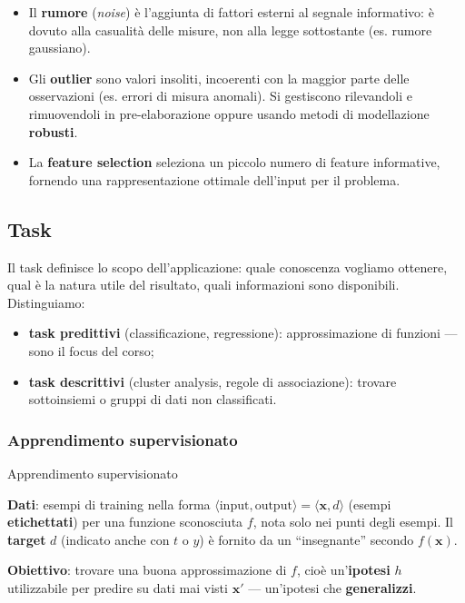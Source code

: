 \begin{itemize}
\tightlist
\item
  Il \textbf{rumore} (\emph{noise}) è l'aggiunta di fattori esterni al
  segnale informativo: è dovuto alla casualità delle misure, non alla
  legge sottostante (es. rumore gaussiano).
\item
  Gli \textbf{outlier} sono valori insoliti, incoerenti con la maggior
  parte delle osservazioni (es. errori di misura anomali). Si gestiscono
  rilevandoli e rimuovendoli in pre-elaborazione oppure usando metodi di
  modellazione \textbf{robusti}.
\item
  La \textbf{feature selection} seleziona un piccolo numero di feature
  informative, fornendo una rappresentazione ottimale dell'input per il
  problema.
\end{itemize}

\subsection{Task}\label{task}

Il task definisce lo scopo dell'applicazione: quale conoscenza vogliamo
ottenere, qual è la natura utile del risultato, quali informazioni sono
disponibili. Distinguiamo:

\begin{itemize}
\tightlist
\item
  \textbf{task predittivi} (classificazione, regressione):
  approssimazione di funzioni --- sono il focus del corso;
\item
  \textbf{task descrittivi} (cluster analysis, regole di associazione):
  trovare sottoinsiemi o gruppi di dati non classificati.
\end{itemize}

\subsubsection{Apprendimento
supervisionato}\label{apprendimento-supervisionato}

\begin{boxdefinition}{Apprendimento supervisionato}

\textbf{Dati}: esempi di training nella forma
\(\langle \text{input}, \text{output}\rangle = \langle \mathbf{x}, d\rangle\)
(esempi \textbf{etichettati}) per una funzione sconosciuta \(f\), nota
solo nei punti degli esempi. Il \textbf{target} \(d\) (indicato anche
con \(t\) o \(y\)) è fornito da un ``insegnante'' secondo
\(f(\mathbf{x})\).

\textbf{Obiettivo}: trovare una buona approssimazione di \(f\), cioè
un'\textbf{ipotesi} \(h\) utilizzabile per predire su dati mai visti
\(\mathbf{x}'\) --- un'ipotesi che \textbf{generalizzi}.

\end{boxdefinition}

